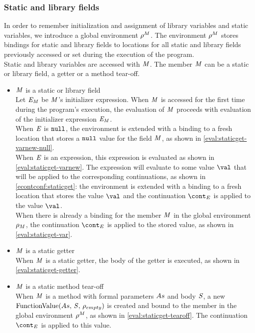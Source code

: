 \documentclass{article}
\begin{document}
\subsubsection{Static and library fields}
\label{subsubsec:static-and-library-fields}

In order to remember initialization and assignment of library variables and static variables, we introduce a global environment $\rho^{M}$.
The environment $\rho^{M}$ stores bindings for static and library fields to locations for all static and library fields previously accessed or set during the execution of the program.\\
Static and library variables are accessed with $\mathit{M}$.
The member $\mathit{M}$ can be a static or library field, a getter or a method tear-off.
\begin{itemize}
\item $\mathit{M}$ is a static or library field\\
Let $\mathit{E}_{\mathit{M}}$ be $\mathit{M}$'s initializer expression.
When $\mathit{M}$ is accessed for the first time during the program's execution, the evaluation of $\mathit{M}$ proceeds with evaluation of the initializer expression $\mathit{E}_{\mathit{M}}$.\\
\noindent
When $\mathit{E}$ is $\tt{null}$, the environment is extended with a binding to a fresh location that stores a $\tt{null}$ value for the field $\mathit{M}$, as shown in \eqref{eval:staticget-varnew-null}.\\
\noindent
When $\mathit{E}$ is an expression, this expression is evaluated as shown in \eqref{eval:staticget-varnew}.
The expression will evaluate to some value $\val$ that will be applied to the corresponding continuations, as shown in \eqref{econtconf:staticget}: the environment is extended with a binding to a fresh location that stores the value $\val$ and the continuation $\econt$ is applied to the value $\val$.\\
\noindent
When there is already a binding for the member $\mathit{M}$ in the global environment $\rho_{M}$, the continuation $\econt$ is applied to the stored value, as shown in \eqref{eval:staticget-var}.
\item $\mathit{M}$ is a static getter\\
\noindent
When $\mathit{M}$ is a static getter, the body of the getter is executed, as shown in \eqref{eval:staticget-getter}.
\item $\mathit{M}$ is a static method tear-off\\
\noindent
When $\mathit{M}$ is a method with formal parameters $As$ and body $\mathit{S}$, a new $\mathrm{FunctionValue}({As},\,{\mathit{S}},\,{\rho_{empty}})$ is created and bound to the member in the global environment $\rho^{M}$, as shown in \eqref{eval:staticget-tearoff}.
The continuation $\econt$ is applied to this value.
\end{itemize}
\end{document}
